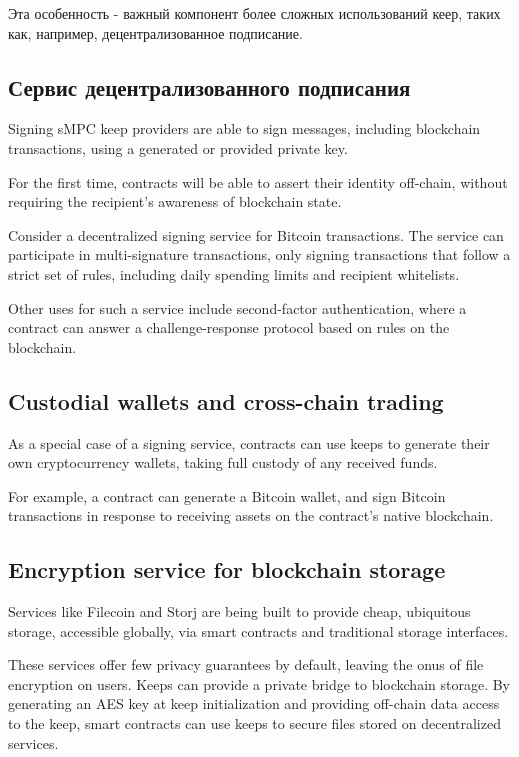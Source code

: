 \documentclass[russian,english,11pt]{article}
\begin{document}
Эта особенность - важный компонент более сложных использований кеер, 
таких как, например, децентрализованное подписание.

\subsection{Сервис децентрализованного подписания}

Signing sMPC keep providers are able to sign messages, including
blockchain transactions, using a generated or provided private key.

For the first time, contracts will be able to assert their identity
off-chain, without requiring the recipient's awareness of blockchain
state.

Consider a decentralized signing service for Bitcoin transactions. The
service can participate in multi-signature transactions, only signing
transactions that follow a strict set of rules, including daily
spending limits and recipient whitelists.

Other uses for such a service include second-factor authentication,
where a contract can answer a challenge-response protocol based on
rules on the blockchain.

\subsection{Custodial wallets and cross-chain trading}

As a special case of a signing service, contracts can use keeps to
generate their own cryptocurrency wallets, taking full custody of any
received funds.

For example, a contract can generate a Bitcoin wallet, and sign
Bitcoin transactions in response to receiving assets on the contract's
native blockchain.

\subsection{Encryption service for blockchain storage}

Services like Filecoin \cite{filecoin} and Storj \cite{storj} are
being built to provide cheap, ubiquitous storage, accessible globally,
via smart contracts and traditional storage interfaces.

These services offer few privacy guarantees by default, leaving the
onus of file encryption on users. Keeps can provide a private bridge
to blockchain storage. By generating an AES key at keep initialization
and providing off-chain data access to the keep, smart contracts can
use keeps to secure files stored on decentralized services.
\end{document}
